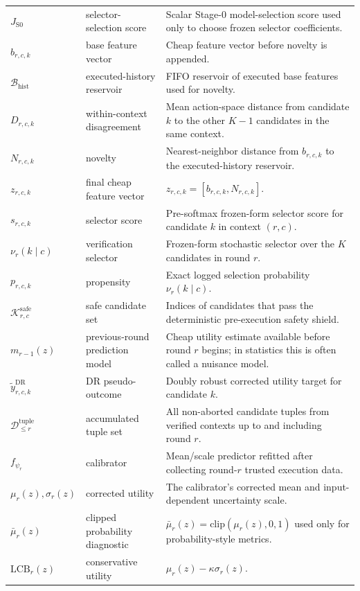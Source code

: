 \documentclass[10pt]{article}
\theoremstyle{plain}
\theoremstyle{definition}
\theoremstyle{remark}
\newcommand{\LCB}{\mathrm{LCB}}
\begin{document}
{\begin{longtable}{@{}>{\raggedright\arraybackslash}p{3.25cm}>{\raggedright\arraybackslash}p{2.55cm}>{\raggedright\arraybackslash}p{8.35cm}@{}}
$J_{\mathrm{S0}}$ & selector-selection score & Scalar Stage-0 model-selection score used only to choose frozen selector coefficients. \\
$b_{r,c,k}$ & base feature vector & Cheap feature vector before novelty is appended. \\
$\mathcal B_{\mathrm{hist}}$ & executed-history reservoir & FIFO reservoir of executed base features used for novelty. \\
$D_{r,c,k}$ & within-context disagreement & Mean action-space distance from candidate $k$ to the other $K-1$ candidates in the same context. \\
$N_{r,c,k}$ & novelty & Nearest-neighbor distance from $b_{r,c,k}$ to the executed-history reservoir. \\
$z_{r,c,k}$ & final cheap feature vector & $z_{r,c,k}=[b_{r,c,k},N_{r,c,k}]$. \\
$s_{r,c,k}$ & selector score & Pre-softmax frozen-form selector score for candidate $k$ in context $(r,c)$. \\
$\nu_r(k\mid c)$ & verification selector & Frozen-form stochastic selector over the $K$ candidates in round $r$. \\
$p_{r,c,k}$ & propensity & Exact logged selection probability $\nu_r(k\mid c)$. \\
$\mathcal K^{\mathrm{safe}}_{r,c}$ & safe candidate set & Indices of candidates that pass the deterministic pre-execution safety shield. \\
$m_{r-1}(z)$ & previous-round prediction model & Cheap utility estimate available before round $r$ begins; in statistics this is often called a nuisance model. \\
$\tilde y^{\mathrm{DR}}_{r,c,k}$ & DR pseudo-outcome & Doubly robust corrected utility target for candidate $k$. \\
$\mathcal D^{\mathrm{tuple}}_{\le r}$ & accumulated tuple set & All non-aborted candidate tuples from verified contexts up to and including round $r$. \\
$f_{\psi_r}$ & calibrator & Mean/scale predictor refitted after collecting round-$r$ trusted execution data. \\
$\mu_r(z),\sigma_r(z)$ & corrected utility & The calibrator's corrected mean and input-dependent uncertainty scale. \\
$\bar\mu_r(z)$ & clipped probability diagnostic & $\bar\mu_r(z)=\mathrm{clip}(\mu_r(z),0,1)$ used only for probability-style metrics. \\
$\LCB_r(z)$ & conservative utility & $\mu_r(z)-\kappa\sigma_r(z)$. \\

\end{longtable}}
\end{document}
